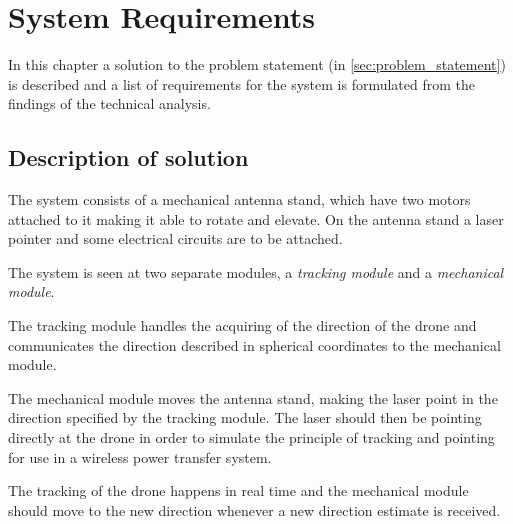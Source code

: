 \graphicspath{{figures/requirements/}}

\chapter{System Requirements} \label{ch:SystemRequirements}
In this chapter a solution to the problem statement (in \autoref{sec:problem_statement}) is described and a list of requirements for the system is formulated from the findings of the technical analysis. 

\section{Description of solution}


The system consists of a mechanical antenna stand, which have two motors attached to it making it able to rotate and elevate. On the antenna stand a laser pointer and some electrical circuits are to be attached. 

The system is seen at two separate modules, a \textit{tracking module} and a \textit{mechanical module}. 

The tracking module handles the acquiring of the direction of the drone and communicates the direction described in spherical coordinates to the mechanical module. 

The mechanical module moves the antenna stand, making the laser point in the direction specified by the tracking module. The laser should then be pointing directly at the drone in order to simulate the principle of tracking and pointing for use in a wireless power transfer system.

The tracking of the drone happens in real time and the mechanical module should move to the new direction whenever a new direction estimate is received.

